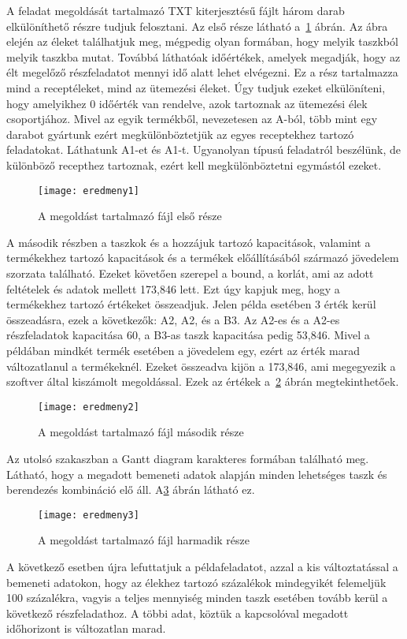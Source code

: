 A feladat megoldását tartalmazó TXT kiterjesztésű fájlt három darab elkülöníthető részre tudjuk felosztani. Az első része látható a~\ref{eredmeny1} ábrán. Az ábra elején az éleket találhatjuk meg, mégpedig olyan formában, hogy melyik taszkból melyik taszkba mutat. Továbbá láthatóak időértékek, amelyek megadják, hogy az élt megelőző részfeladatot mennyi idő alatt lehet elvégezni. Ez a rész tartalmazza mind a receptéleket, mind az ütemezési éleket. Úgy tudjuk ezeket elkülöníteni, hogy amelyikhez 0 időérték van rendelve, azok tartoznak az ütemezési élek csoportjához. Mivel az egyik termékből, nevezetesen az A-ból, több mint egy darabot gyártunk ezért megkülönböztetjük az egyes receptekhez tartozó feladatokat. Láthatunk A1-et és A1-t. Ugyanolyan típusú feladatról beszélünk, de különböző recepthez tartoznak, ezért kell megkülönböztetni egymástól ezeket. 
\begin{figure}[H]
\begin{center}
\texttt{[image: eredmeny1]}
\caption{A megoldást tartalmazó fájl első része}
\label{eredmeny1}
\end{center}
\end{figure}
A második részben a taszkok és a hozzájuk tartozó kapacitások, valamint a termékekhez tartozó kapacitások és a termékek előállításából származó jövedelem szorzata található. Ezeket követően szerepel a bound, a korlát, ami az adott feltételek és adatok mellett 173,846 lett. Ezt úgy kapjuk meg, hogy a termékekhez tartozó értékeket összeadjuk. Jelen példa esetében 3 érték kerül összeadásra, ezek a következők: A2, A2, és a B3. Az A2-es és a A2-es részfeladatok kapacitása 60, a B3-as taszk kapacitása pedig 53,846. Mivel a példában mindkét termék esetében a jövedelem egy, ezért az érték marad változatlanul a termékeknél. Ezeket összeadva kijön a 173,846, ami megegyezik a szoftver által kiszámolt megoldással. Ezek az értékek a~\ref{eredmeny2} ábrán megtekinthetőek.
\begin{figure}[H]
\begin{center}
\texttt{[image: eredmeny2]}
\caption{A megoldást tartalmazó fájl második része}
\label{eredmeny2}
\end{center}
\end{figure}
Az utolsó szakaszban a Gantt diagram karakteres formában található meg. Látható, hogy a megadott bemeneti adatok alapján minden lehetséges taszk és berendezés kombináció elő áll. A\ref{eredmeny3} ábrán látható ez. 
\begin{figure}[H]
\begin{center}
\texttt{[image: eredmeny3]}
\caption{A megoldást tartalmazó fájl harmadik része}
\label{eredmeny3}
\end{center}
\end{figure}
A következő esetben újra lefuttatjuk a példafeladatot, azzal a kis változtatással a bemeneti adatokon, hogy az élekhez tartozó százalékok mindegyikét felemeljük 100 százalékra, vagyis a teljes mennyiség minden taszk esetében tovább kerül a következő részfeladathoz. A többi adat, köztük a kapcsolóval megadott időhorizont is változatlan marad. 

